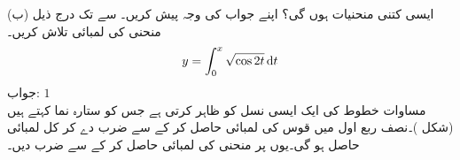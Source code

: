  (ب) ایسی کتنی منحنیات ہوں گی؟ اپنے جواب کی وجہ پیش کریں۔ 
 سے  تک درج ذیل منحنی کی لمبائی تلاش کریں۔
\begin{align*}
y=\int_0^x\sqrt{\cos 2t}\dif t
\end{align*}
جواب:\quad
$1$
\\
مساوات  خطوط کی ایک ایسی نسل کو ظاہر کرتی ہے جس کو ستارہ نما کہتے ہیں (شکل )۔نصف ربع اول میں قوس کی لمبائی حاصل کر کے  سے ضرب دے کر کل لمبائی حاصل ہو گی۔یوں  پر منحنی  کی لمبائی حاصل کر کے  سے ضرب دیں۔
